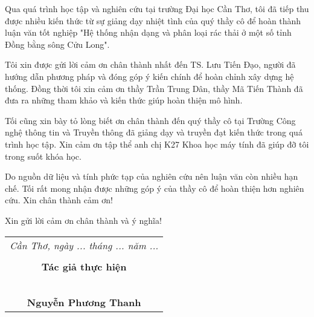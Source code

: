 \documentclass[./thesis.tex]{subfiles}
\begin{document}
{\fontsize{13}{12} \selectfont
Qua quá trình học tập và nghiên cứu tại trường Đại học Cần Thơ, tôi đã tiếp thu được nhiều kiến thức từ sự giảng dạy nhiệt tình của quý thầy cô để hoàn thành luận văn tốt nghiệp "Hệ thống nhận dạng và phân loại rác thải ở một số tỉnh Đồng bằng sông Cửu Long". 

Tôi xin được gửi lời cảm ơn chân thành nhất đến TS. Lưu Tiến Đạo, người đã hướng dẫn phương pháp và đóng góp ý kiến chính để hoàn chỉnh xây dựng hệ thống.
Đồng thời tôi xin cảm ơn thầy Trần Trung Dân, thầy Mã Tiến Thành đã đưa ra những tham khảo và kiến thức giúp hoàn thiện mô hình.

Tối cũng xin bày tỏ lòng biết ơn chân thành đến quý thầy cô tại Trường Công nghệ thông tin và Truyền thông đã giảng dạy và truyền đạt kiến thức trong quá trình học tập. Xin cảm ơn tập thể anh chị K27 Khoa học máy tính đã giúp đỡ tôi trong suốt khóa học.

Do nguồn dữ liệu và tính phức tạp của nghiên cứu nên luận văn còn nhiều hạn chế. Tối rất mong nhận được những góp ý của thầy cô để hoàn thiện hơn nghiên cứu.
Xin chân thành cảm ơn!}

{\fontsize{13}{12} \selectfont
Xin gửi lời cảm ơn chân thành và ý nghĩa!
}

{\fontsize{13}{12} \selectfont
\hspace*{\fill}
\begin{tabular}{@{}c@{}} 

\\ \textit{Cần Thơ, ngày ... tháng ... năm ... } \\ \\
\textbf{Tác giả thực hiện}\\ \\
\\
\\
\\
\\
\textbf{Nguyễn Phương Thanh}
\end{tabular}}
\end{document}

